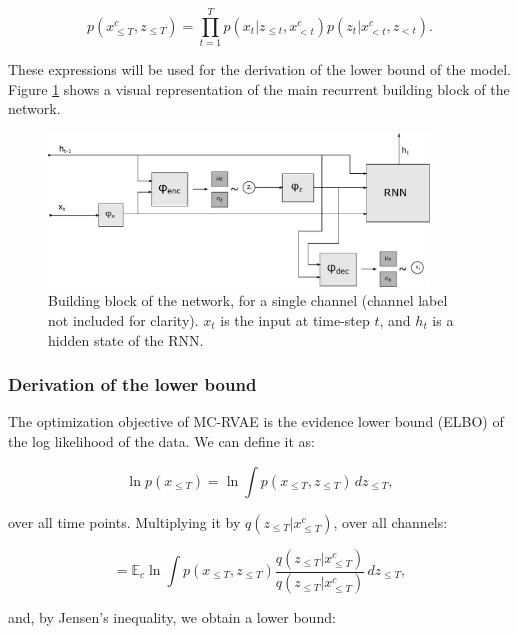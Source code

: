 \begin{equation} \label{eq:encfact}
    \mathit{p}(x^c_{\leq T}, z_{\leq T}) = \prod^T_{t=1} \mathit{p}(x_t | z_{\leq t}, x^c_{<t})\mathit{p}(z_t | x^c_{<t}, z_{<t}).
\end{equation}

These expressions will be used for the derivation of the lower bound of the model. Figure \ref{fig:rnn} shows a visual representation of the main recurrent building block of the network.

\begin{figure}[!htbp]
  \centering
    \includegraphics[width=0.9\textwidth]{figures/rnnvae/Fig1.pdf}
  \caption[Building block of the network, for a single channel.]{Building block of the network, for a single channel (channel label not included for clarity). $x_t$ is the input at time-step $t$, and $h_t$ is a hidden state of the RNN. }\label{fig:rnn}
\end{figure}

\subsubsection{Derivation of the lower bound}
The optimization objective of MC-RVAE is the evidence lower bound (ELBO) \cite{Kingma2014} of the log likelihood of the data. We can define it as:

\begin{equation}
    \ln \mathit{p}(x_{\leq T}) = \ln \int \mathit{p}(x_{\leq T}, z_{\leq T}) \,dz_{\leq T},
\end{equation}

over all time points. Multiplying it by $\mathit{q}(z_{\leq T}|x^c_{\leq T})$, over all channels:

\begin{equation}
= \mathbb{E}_c \ln \int \mathit{p}(x_{\leq T}, z_{\leq T}) \frac{\mathit{q}(z_{\leq T}|x^c_{\leq T})}{\mathit{q}(z_{\leq T}|x^c_{\leq T})} \,dz_{\leq T},
\end{equation}

and, by Jensen's inequality, we obtain a lower bound:

